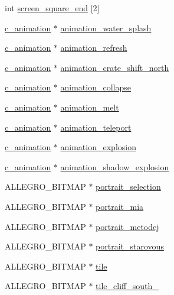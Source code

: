 \begin{DoxyCompactItemize}
\item 
int \hyperlink{classc__map_a4fd1b68220337cb514fed398fe79b7ab}{screen\-\_\-square\-\_\-end} \mbox{[}2\mbox{]}
\item 
\hyperlink{classc__animation}{c\-\_\-animation} $\ast$ \hyperlink{classc__map_a777d0b0ec7a0a14c1ccae809cb09f4b1}{animation\-\_\-water\-\_\-splash}
\item 
\hyperlink{classc__animation}{c\-\_\-animation} $\ast$ \hyperlink{classc__map_a27650c86dc14f11dff3d582f3ffd540e}{animation\-\_\-refresh}
\item 
\hyperlink{classc__animation}{c\-\_\-animation} $\ast$ \hyperlink{classc__map_ab18a6618eae74007423595aaa606b15c}{animation\-\_\-crate\-\_\-shift\-\_\-north}
\item 
\hyperlink{classc__animation}{c\-\_\-animation} $\ast$ \hyperlink{classc__map_af34abe429db8bba11ccc582a5c2b0b29}{animation\-\_\-collapse}
\item 
\hyperlink{classc__animation}{c\-\_\-animation} $\ast$ \hyperlink{classc__map_a23a9d2c692bc90f9b78f1274f24378e7}{animation\-\_\-melt}
\item 
\hyperlink{classc__animation}{c\-\_\-animation} $\ast$ \hyperlink{classc__map_a812ca3ddb1f4ff364861a4a4f3318caf}{animation\-\_\-teleport}
\item 
\hyperlink{classc__animation}{c\-\_\-animation} $\ast$ \hyperlink{classc__map_a1be7994a019936dccdf711ca8bfcaba3}{animation\-\_\-explosion}
\item 
\hyperlink{classc__animation}{c\-\_\-animation} $\ast$ \hyperlink{classc__map_ad52da3cd4cd1e0c88ce8170314b09f78}{animation\-\_\-shadow\-\_\-explosion}
\item 
A\-L\-L\-E\-G\-R\-O\-\_\-\-B\-I\-T\-M\-A\-P $\ast$ \hyperlink{classc__map_a297d97b704636559a28596af02cf9f79}{portrait\-\_\-selection}
\item 
A\-L\-L\-E\-G\-R\-O\-\_\-\-B\-I\-T\-M\-A\-P $\ast$ \hyperlink{classc__map_a9816fa208514e89a87693508fa5606ae}{portrait\-\_\-mia}
\item 
A\-L\-L\-E\-G\-R\-O\-\_\-\-B\-I\-T\-M\-A\-P $\ast$ \hyperlink{classc__map_af599cccfc6f1260aa5c1b0a236dca397}{portrait\-\_\-metodej}
\item 
A\-L\-L\-E\-G\-R\-O\-\_\-\-B\-I\-T\-M\-A\-P $\ast$ \hyperlink{classc__map_a9801a871513ce172735eb4afe070f184}{portrait\-\_\-starovous}
\item 
A\-L\-L\-E\-G\-R\-O\-\_\-\-B\-I\-T\-M\-A\-P $\ast$ \hyperlink{classc__map_a928e809cafb17cee55193944f6aafe24}{tile}
\item 
A\-L\-L\-E\-G\-R\-O\-\_\-\-B\-I\-T\-M\-A\-P $\ast$ \hyperlink{classc__map_ab84679456c3df51222049c4fb80d66a9}{tile\-\_\-cliff\-\_\-south\-\_}

\end{DoxyCompactItemize}
